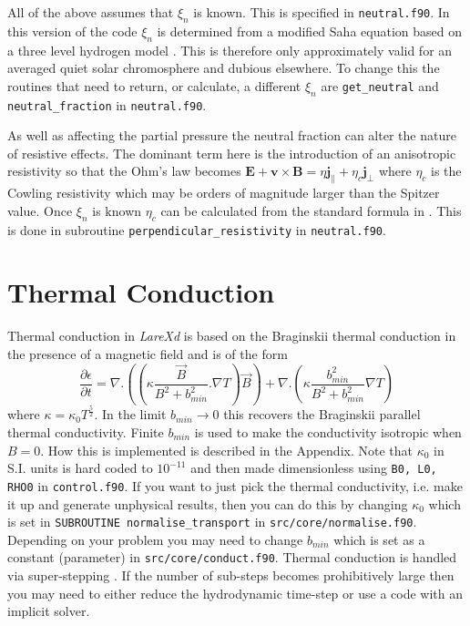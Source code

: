 \documentclass[11pt]{article}
\begin{document}
All of the above assumes that $\xi_n$ is known. This is specified in \texttt{neutral.f90}. In this version of the code $\xi_n$ is 
determined from a modified Saha equation based on a three level hydrogen model \cite{brown}. This is therefore only approximately 
valid for an averaged quiet solar chromosphere and dubious elsewhere. To change this the routines that need to return, or calculate, 
a different $\xi_n$ 
are \texttt{get\_neutral} and \texttt{neutral\_fraction} in \texttt{neutral.f90}. 

As well as affecting the partial pressure the neutral fraction can alter the nature of resistive effects. The dominant 
term here is the introduction of an anisotropic resistivity so that the Ohm's law becomes
$\mathbf{E}+\mathbf{v}\times\mathbf{B}=\eta \mathbf{j_{\parallel}} + \eta_c \mathbf{j_{\perp}}$
where $\eta_c$ is the Cowling resistivity which may be orders of magnitude larger than the Spitzer value. Once $\xi_n$ 
is known $\eta_c$ can be calculated from the standard formula in \cite{flux-emergence}. This is done in subroutine 
\texttt{perpendicular\_resistivity} in \texttt{neutral.f90}.

\section{Thermal Conduction} %
\label{sec:thermal_conduction}
Thermal conduction in {\it LareXd} is based on the Braginskii thermal conduction in the presence of a magnetic field 
and is of the form\\
\[
\frac{\partial \epsilon}{\partial t} = \nabla . \left(\left(\kappa \frac{\vec{B}}{B^2+b_{min}^2}. 
\nabla T\right) \vec{B} \right) +  \nabla . \left(\kappa  \frac{b_{min}^2}{B^2+b_{min}^2}  \nabla T \right)
\]
where $\kappa = \kappa_0  T^\frac{5}{2}$. In the limit $b_{min}\to 0$ this recovers the Braginskii parallel thermal 
conductivity. Finite $b_{min}$ is used to make the conductivity isotropic when $B=0$.  How this is implemented is 
described in the Appendix. Note that $\kappa_0$ in S.I. units is hard coded to $10^{-11}$ and then made dimensionless using 
{\tt B0, L0, RHO0} in {\tt control.f90}. If you want to just pick the thermal conductivity, 
i.e. make it up and generate unphysical results, then you can do this by changing $\kappa_0$ 
which is set in {\tt SUBROUTINE normalise\_transport} in {\tt src/core/normalise.f90}. Depending 
on your problem you may need to change $b_{min}$ which is set as a constant (parameter) in 
{\tt src/core/conduct.f90}. Thermal conduction is handled via super-stepping \cite{Meyer:2012eb}. 
If the number of sub-steps becomes prohibitively large then you may need to either reduce the hydrodynamic
time-step or use a code with an implicit solver.
\end{document}
